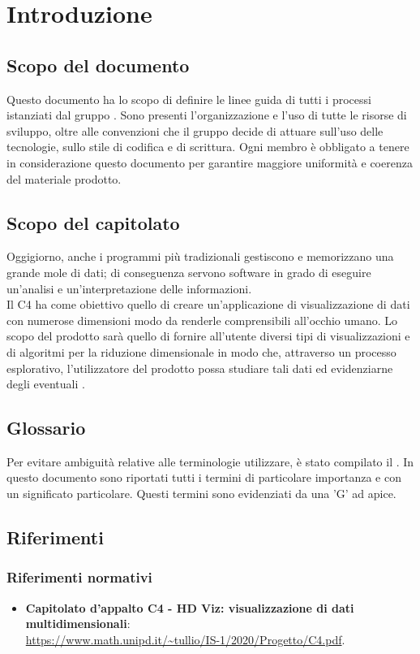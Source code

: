 \section{Introduzione}
\subsection{Scopo del documento}
Questo documento ha lo scopo di definire le linee guida di tutti i processi istanziati dal gruppo \Gruppo{}. Sono presenti l'organizzazione e l'uso di tutte le risorse di sviluppo, oltre alle convenzioni che il gruppo decide di attuare sull'uso delle tecnologie, sullo stile di codifica e di scrittura. Ogni membro è obbligato a tenere in considerazione questo documento per garantire maggiore uniformità e coerenza del materiale prodotto.

\subsection{Scopo del capitolato}
Oggigiorno, anche i programmi più tradizionali gestiscono e memorizzano una grande mole di dati; di conseguenza servono software in grado di eseguire un'analisi e un'interpretazione delle informazioni.\\
Il  C4 ha come obiettivo quello di creare un'applicazione di visualizzazione di dati con numerose dimensioni modo da renderle comprensibili all'occhio umano.  Lo scopo del prodotto sarà quello di fornire all'utente diversi tipi di visualizzazioni e di algoritmi per la riduzione dimensionale in modo che, attraverso un processo esplorativo, l'utilizzatore del prodotto possa studiare tali dati ed evidenziarne degli eventuali . 

\subsection{Glossario}
Per evitare ambiguità relative alle terminologie utilizzare, è stato compilato il . In questo documento sono riportati tutti i termini di particolare importanza e con un significato particolare. Questi termini sono evidenziati da una 'G' ad apice.

\subsection{Riferimenti}
\subsubsection{Riferimenti normativi}
\begin{itemize}	
	\item \textbf{Capitolato d'appalto C4 - HD Viz: visualizzazione di dati multidimensionali}:\\
	\textcolor{blue}{\url{https://www.math.unipd.it/~tullio/IS-1/2020/Progetto/C4.pdf}}.
\end{itemize}

